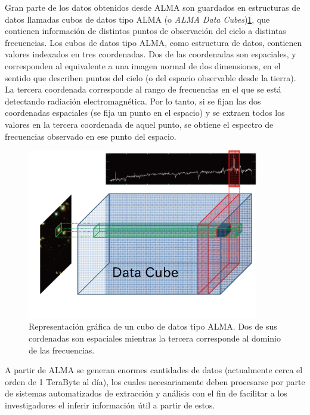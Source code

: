 Gran parte de los datos obtenidos desde ALMA son guardados en estructuras de datos llamadas cubos de datos tipo ALMA (o \textit{ALMA Data Cubes})\ref{fig:data_cube}, que contienen información de distintos puntos de observación del cielo a distintas frecuencias. Los cubos de datos tipo ALMA, como estructura de datos, contienen valores indexados en tres coordenadas. Dos de las coordenadas son espaciales, y corresponden al equivalente a una imagen normal de dos dimensiones, en el sentido que describen puntos del cielo (o del espacio observable desde la tierra). La tercera coordenada corresponde al rango de frecuencias en el que se está detectando radiación electromagnética. Por lo tanto, si se fijan las dos coordenadas espaciales (se fija un punto en el espacio) y se extraen todos los valores en la tercera coordenada de aquel punto, se obtiene el espectro de frecuencias observado en ese punto del espacio.

\begin{figure}[h!]
\begin{center}
\includegraphics[width=0.9\textwidth]{imagenes/data_cube.png}
\end{center}
\vspace*{-5mm}
\caption{Representación gráfica de un cubo de datos tipo ALMA. Dos de sus cordenadas son espaciales mientras la tercera corresponde al dominio de las frecuencias.}
\label{fig:data_cube}
\end{figure}

A partir de ALMA se generan enormes cantidades de datos (actualmente cerca el orden de 1 TeraByte al día), los cuales necesariamente deben procesarse por parte de sistemas automatizados de extracción y análisis con el fin de facilitar a los investigadores el inferir información útil a partir de estos.

